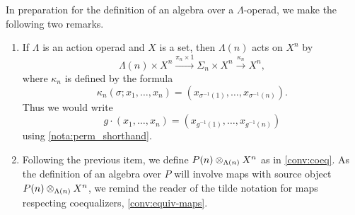 \begin{rem}\label{rem:aop-alg-pre}
In preparation for the definition of an algebra over a $\Lambda$-operad, we make the following two remarks.
\begin{enumerate}
\item If $\Lambda$ is an action operad and $X$ is a set, then $\Lambda(n)$ acts on $X^n$ by 
\[
\Lambda(n) \times X^n \stackrel{\pi_n \times 1}{\to} \Sigma_n \times X^n \stackrel{\kappa_n}{\to} X^n,
\]
where $\kappa_n$ is defined by the formula
\[
\kappa_n(\sigma; x_1, \ldots, x_n) = (x_{\sigma^{-1}(1)}, \ldots, x_{\sigma^{-1}(n)}).
\]
Thus we would write
\[
g \cdot (x_1, \ldots, x_n) = (x_{g^{-1}(1)}, \ldots, x_{g^{-1}(n)})
\]
using \cref{nota:perm_shorthand}.
\item Following the previous item, we define $P(n) \otimes_{\Lambda(n)} X^{n}$ as in \cref{conv:coeq}. As the definition of an algebra over $P$ will involve maps with source object $P(n) \otimes_{\Lambda(n)} X^{n}$, we remind the reader of the tilde notation for maps respecting coequalizers, \cref{conv:equiv-maps}.
\end{enumerate}
\end{rem}


